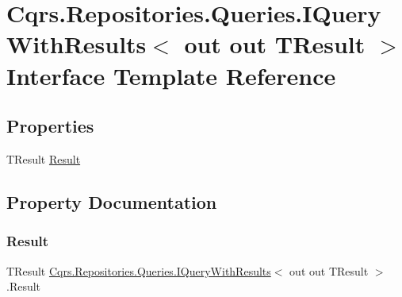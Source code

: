 \hypertarget{interfaceCqrs_1_1Repositories_1_1Queries_1_1IQueryWithResults}{}\section{Cqrs.\+Repositories.\+Queries.\+I\+Query\+With\+Results$<$ out out T\+Result $>$ Interface Template Reference}
\label{interfaceCqrs_1_1Repositories_1_1Queries_1_1IQueryWithResults}
\subsection*{Properties}
\begin{DoxyCompactItemize}
\item 
T\+Result \hyperlink{interfaceCqrs_1_1Repositories_1_1Queries_1_1IQueryWithResults_a54dc0f77254920505e4bc9793bb32b1a_a54dc0f77254920505e4bc9793bb32b1a}{Result}
\end{DoxyCompactItemize}


\subsection{Property Documentation}
\mbox{\label{interfaceCqrs_1_1Repositories_1_1Queries_1_1IQueryWithResults_a54dc0f77254920505e4bc9793bb32b1a_a54dc0f77254920505e4bc9793bb32b1a}} 
\subsubsection{\texorpdfstring{Result}{Result}}
{\footnotesize\ttfamily T\+Result \hyperlink{interfaceCqrs_1_1Repositories_1_1Queries_1_1IQueryWithResults}{Cqrs.\+Repositories.\+Queries.\+I\+Query\+With\+Results}$<$ out out T\+Result $>$.Result\hspace{0.3cm}{\ttfamily [get]}}

